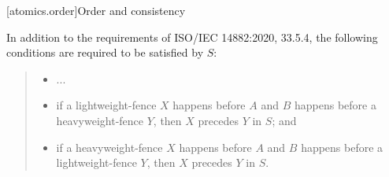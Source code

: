 

[atomics.order]{Order and consistency}






In addition to the requirements of ISO/IEC 14882:2020, 33.5.4, the
following conditions are required to be satisfied by $S$:
\begin{quote}
\begin{itemize}
\item
  ...
\item
if a  lightweight-fence $X$ happens before $A$ and $B$ happens
before a  heavyweight-fence $Y$, then $X$ precedes $Y$ in $S$; and
\item  if a  heavyweight-fence $X$ happens before $A$ and $B$ happens
before a  lightweight-fence $Y$, then $X$ precedes $Y$ in $S$.
\end{itemize}
\end{quote}
